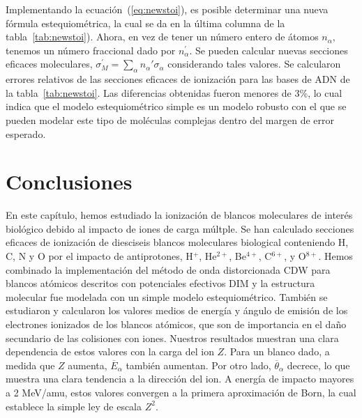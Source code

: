 Implementando la ecuación~(\ref{eq:newstoi}), es posible determinar
una nueva fórmula estequiométrica, la cual se da en la última columna de
la tabla~\ref{tab:newstoi}). Ahora, en vez de tener un número entero 
de átomos $n_{\alpha}$, tenemos un número fraccional dado por 
$n_{\alpha}^{\prime}$. Se pueden calcular nuevas secciones eficaces 
moleculares, $\sigma^{\prime}_{M}=\sum_{\alpha}n_{\alpha}'\sigma_{\alpha}$
considerando tales valores. Se calcularon errores relativos de las 
secciones eficaces de ionización para las bases de ADN de la 
tabla~\ref{tab:newstoi}. Las diferencias obtenidas fueron menores de
3\%, lo cual indica que el modelo estequiométrico simple 
es un modelo robusto con el que se pueden modelar este tipo de 
moléculas complejas dentro del margen de error esperado.

\section{Conclusiones}

En este capítulo, hemos estudiado la ionización de blancos moleculares 
de interés biológico debido al impacto de iones de carga múltple. Se han
calculado secciones eficaces de ionización de diesciseis blancos 
moleculares biological conteniendo H, C, N y O por el impacto de
antiprotones, H$^{+}$, He$^{2+}$, Be$^{4+}$, C$^{6+}$, y O$^{8+}$. 
Hemos combinado la implementación del método de onda distorcionada
CDW para blancos atómicos descritos con potenciales efectivos DIM y la 
estructura molecular fue modelada con un simple modelo estequiométrico.
También se estudiaron y calcularon los valores medios de energía y 
ángulo de emisión de los electrones ionizados de los blancos atómicos, 
que son de importancia en el daño secundario de las colisiones con iones.
Nuestros resultados muestran una clara dependencia de estos valores con 
la carga del ion $Z$. Para un blanco dado, a medida que $Z$ aumenta,
$\overline{E}_{\alpha}$ también aumentan. Por otro lado, 
$\overline{\theta}_{\alpha}$ decrece, lo que muestra una clara tendencia 
a la dirección del ion. A energía de impacto mayores a 2 MeV/amu, estos
valores convergen a la primera aproximación de Born, la cual establece 
la simple ley de escala $Z^{2}$. 


